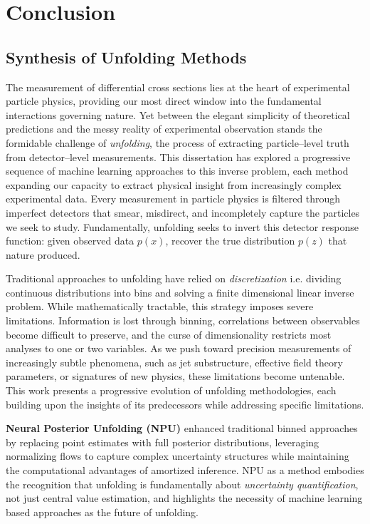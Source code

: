 \chapter{Conclusion}
\label{chap:conclusion}
\section{Synthesis of Unfolding Methods}
    The measurement of differential cross sections lies at the heart of experimental particle physics, providing our most direct window into the fundamental interactions governing nature.
    Yet between the elegant simplicity of theoretical predictions and the messy reality of experimental observation stands the formidable challenge of \emph{unfolding}, the process of extracting particle--level truth from detector--level measurements.
    This dissertation has explored a progressive sequence of machine learning approaches to this inverse problem, each method expanding our capacity to extract physical insight from increasingly complex experimental data.
    Every measurement in particle physics is filtered through imperfect detectors that smear, misdirect, and incompletely capture the particles we seek to study.
    Fundamentally, unfolding seeks to invert this detector response function: given observed data \(p(x)\), recover the true distribution \(p(z)\) that nature produced.

    Traditional approaches to unfolding have relied on \emph{discretization} i.e. dividing continuous distributions into bins and solving a finite dimensional linear inverse problem.
    While mathematically tractable, this strategy imposes severe limitations.
    Information is lost through binning, correlations between observables become difficult to preserve, and the curse of dimensionality restricts most analyses to one or two variables.
    As we push toward precision measurements of increasingly subtle phenomena, such as jet substructure, effective field theory parameters, or signatures of new physics, these limitations become untenable.
    This work presents a {progressive evolution} of unfolding methodologies, each building upon the insights of its predecessors while addressing specific limitations.
    
    \textbf{Neural Posterior Unfolding (NPU)} enhanced traditional binned approaches by replacing point estimates with full posterior distributions, leveraging normalizing flows to capture complex uncertainty structures while maintaining the computational advantages of amortized inference.
    NPU as a method embodies the recognition that unfolding is fundamentally about \emph{uncertainty quantification}, not just central value estimation, and highlights the necessity of machine learning based approaches as the future of unfolding.
    
